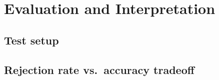 \chapter{Evaluation and Interpretation}\label{chapter:evaluation}

\section{Test setup}

\section{Rejection rate vs.\ accuracy tradeoff}

\section{}